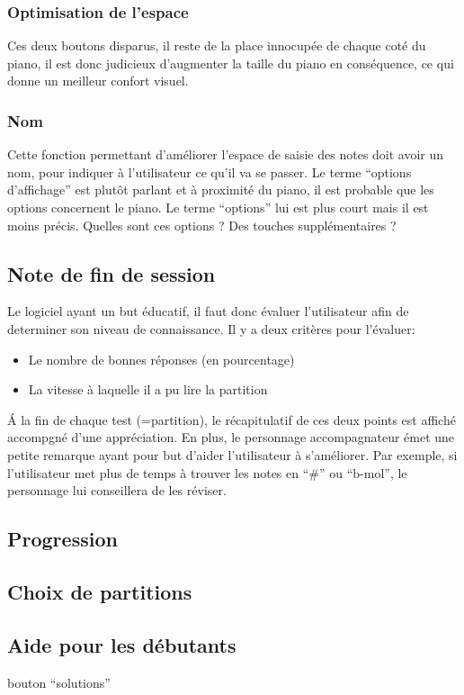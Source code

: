 \documentclass{article}
\begin{document}
\subsubsection{Optimisation de l'espace}
Ces deux boutons disparus, il reste de la place innocupée de chaque coté du piano, il est donc judicieux d'augmenter la taille 
du piano en conséquence, ce qui donne un meilleur confort visuel.

\subsubsection{Nom}
Cette fonction permettant d'améliorer l'espace de saisie des notes doit avoir un nom, pour indiquer à l'utilisateur ce qu'il va se 
passer. Le terme ``options d'affichage'' est plutôt parlant et à proximité du piano, il est probable que les options concernent le 
piano.
Le terme ``options'' lui est plus court mais il est moins précis. Quelles sont ces options ? Des touches supplémentaires ?
\subsection{Note de fin de session}
Le logiciel ayant un but éducatif, il faut donc évaluer l'utilisateur afin de determiner son niveau de connaissance.
Il y a deux critères pour l'évaluer:
\begin{itemize}
 \item Le nombre de bonnes réponses (en pourcentage)
 \item La vitesse à laquelle il a pu lire la partition
\end{itemize}
\'A la fin de chaque test (=partition), le récapitulatif de ces deux points est affiché accompgné d'une appréciation.
En plus, le personnage accompagnateur émet une petite remarque ayant pour but d'aider l'utilisateur à s'améliorer.
Par exemple, si l'utilisateur met plus de temps à trouver les notes en ``#'' ou ``b-mol'', le personnage lui conseillera de les réviser.
\subsection{Progression}
\subsection{Choix de partitions}
\subsection{Aide pour les débutants}
bouton ``solutions''
\end{document}
